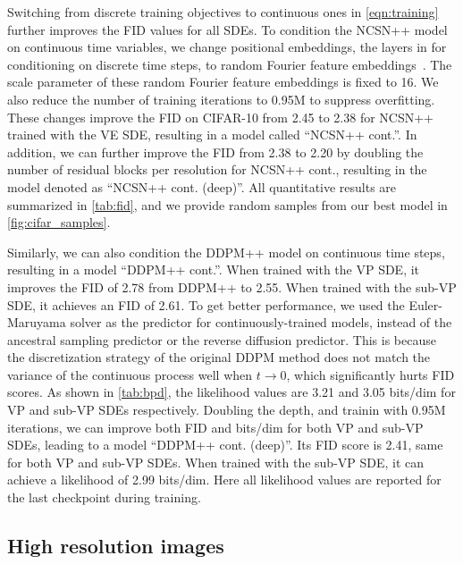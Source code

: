 \documentclass{article} \usepackage{iclr2021_conference,times}
\begin{document}
Switching from discrete training objectives to continuous ones in \cref{eqn:training} further improves the FID values for all SDEs. To condition the NCSN++ model on continuous time variables, we change positional embeddings, the layers in \citet{ho2020denoising} for conditioning on discrete time steps, to random Fourier feature embeddings~\citep{tancik2020fourfeat}. The scale parameter of these random Fourier feature embeddings is fixed to 16. We also reduce the number of training iterations to 0.95M to suppress overfitting. These changes improve the FID on CIFAR-10 from 2.45 to 2.38 for NCSN++ trained with the VE SDE, resulting in a model called ``NCSN++ cont.''. In addition, we can further improve the FID from 2.38 to 2.20 by doubling the number of residual blocks per resolution for NCSN++ cont., resulting in the model denoted as ``NCSN++ cont. (deep)''. All quantitative results are summarized in \cref{tab:fid}, and we provide random samples from our best model in \cref{fig:cifar_samples}. 

Similarly, we can also condition the DDPM++ model on continuous time steps, resulting in a model ``DDPM++ cont.''. When trained with the VP SDE, it improves the FID of 2.78 from DDPM++ to 2.55. When trained with the sub-VP SDE, it achieves an FID of 2.61. To get better performance, we used the Euler-Maruyama solver as the predictor for continuously-trained models, instead of the ancestral sampling predictor or the reverse diffusion predictor. This is because the discretization strategy of the original DDPM method does not match the variance of the continuous process well when $t\to 0$, which significantly hurts FID scores. As shown in \cref{tab:bpd}, the likelihood values are 3.21 and 3.05 bits/dim for VP and sub-VP SDEs respectively. Doubling the depth, and trainin with 0.95M iterations, we can improve both FID and bits/dim for both VP and sub-VP SDEs, leading to a model ``DDPM++ cont. (deep)''. Its FID score is 2.41, same for both VP and sub-VP SDEs. When trained with the sub-VP SDE, it can achieve a likelihood of 2.99 bits/dim. Here all likelihood values are reported for the last checkpoint during training.



\subsection{High resolution images} 
\label{app:hq}
\end{document}
